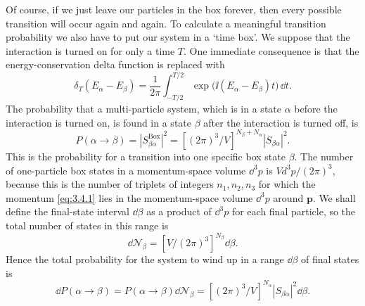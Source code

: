 Of course, if we just leave our particles in the box forever, then every possible transition
will occur again and again. To calculate a meaningful transition probability we also have to
put our system in a `time box'. We suppose that the interaction is turned on for only a time
$T$. One immediate consequence is that the energy-conservation delta function is replaced
with
\begin{equation}
 \delta_T(E_\alpha-E_\beta)=\frac{1}{2\pi}\int_{-T/2}^{T/2}
 \exp\bigl(\ii(E_\alpha-E_\beta)t\bigr)\,\dd t.
 \tag{3.4.6}\label{eq:3.4.6}
\end{equation}
The probability that a multi-particle system, which is in a state $\alpha$ before the
interaction is turned on, is found in a state $\beta$ after the interaction is turned off, is
\begin{equation}
 P(\alpha\to\beta)=|S^{\mathrm{Box}}_{\beta\alpha}|^2
 =\left[(2\pi)^3/V\right]^{N_\beta+N_\alpha}|S_{\beta\alpha}|^2.
 \tag{3.4.7}\label{eq:3.4.7}
\end{equation}
This is the probability for a transition into one specific box state $\beta$. The number of
one-particle box states in a momentum-space volume $\dd^3p$ is $Vd^3p/(2\pi)^3$, because this
is the number of triplets of integers $n_1,n_2,n_3$ for which the momentum \eqref{eq:3.4.1} lies in the
momentum-space volume $\dd^3p$ around $\mathbf{p}$. We shall define the final-state interval
$\dd\beta$ as a product of $\dd^3p$ for each final particle, so the total number of states in this
range is
\begin{equation}
 \dd\mathcal{N}_\beta=\left[V/(2\pi)^3\right]^{N_\beta}\dd\beta.
 \tag{3.4.8}\label{eq:3.4.8}
\end{equation}
Hence the total probability for the system to wind up in a range $\dd\beta$ of final states is
\begin{equation}
 \dd P(\alpha\to\beta)=P(\alpha\to\beta)\dd\mathcal{N}_\beta
 =\left[(2\pi)^3/V\right]^{N_\alpha}|S_{\beta\alpha}|^2\dd\beta.
 \tag{3.4.9}\label{eq:3.4.9}
\end{equation}

